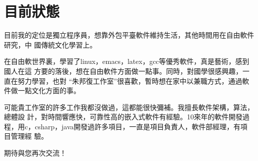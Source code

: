

\section{目前狀態}

目前我的定位是獨立程序員，想靠外包平臺軟件維持生活，其他時間用在自由軟件研究，中
國傳統文化學習上。

在自由軟世界裏，學習了linux，emacs，latex，gcc等優秀軟件，真是藝術，感到國人在這
方要的落後，想在自由軟件方面做一點事。同時，對國學很感興趣，一直在努力學習，也對
``朱邦復工作室''很喜歡，暫時想在家中以兼職方式，通過軟件做一點文化方面的事。

可能貴工作室的許多工作我都沒做過，這都能很快彌補。我擅長軟件架構，算法，總體設
計，對時間響應快，可靠性高的嵌入式軟件有經驗。10來年的軟件開發過
程，用c，csharp，java開發過許多項目，一直是項目負責人，軟件部經理，有項目管理經
驗。

期待與您再次交流！
